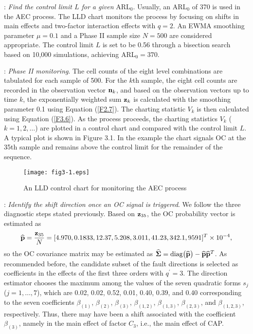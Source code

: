 : {\it Find the control limit $L$ for a given} ARL$_0$.
Usually, an ARL$_0$ of 370 is used in the AEC process. The LLD chart monitors the
process by focusing on shifts in main effects and two-factor interaction effects
with $q=2$. An EWMA smoothing parameter $\mu=0.1$ and a Phase II sample size $N=500$
are considered appropriate. The control limit $L$ is set to be 0.56 through a
bisection search based on 10,000 simulations, achieving ARL$_0=370$.

: {\it Phase II monitoring}. The cell counts of the eight level
combinations are tabulated for each sample of 500. For the $k$th sample, the eight
cell counts are recorded in the observation vector ${\bf n}_k$, and based on the
observation vectors up to time $k$, the exponentially weighted sum ${\bf z}_k$ is
calculated with the smoothing parameter 0.1 using Equation (\ref{F2.7}). The
charting statistic $V_k$ is then calculated using Equation (\ref{F3.6}). As the
process proceeds, the charting statistics $V_k$ ($k=1,2,\ldots$) are plotted in a
control chart and compared with the control limit $L$. A typical plot is shown in
Figure 3.1. In the example the chart signals OC at the 35th sample and remains above
the control limit for the remainder of the sequence.

\begin{figure}[ht]
\begin{center}
\texttt{[image: fig3-1.eps]}
\vspace{-0.7cm} \caption{An LLD control chart for monitoring the AEC
process}\vspace{-0.3cm}
\end{center}
\end{figure}

: {\it Identify the shift direction once an OC signal is
triggered}. We follow the three diagnostic steps stated previously. Based on ${\bf
z}_{35}$, the OC probability vector is estimated as
\[
\widehat{{\bf p}}=\frac{{\bf z}_{35}}{N}=[4.970, 0.1833, 12.37, 5.208, 3.011, 41.23,
342.1, 9591]^T\times 10^{-4},
\]
so the OC covariance matrix may be estimated as
$\widehat{\boldsymbol{\Sigma}}=\mathrm{diag}\big(\widehat{{\bf p}}\big)-\widehat{{\bf p}}\widehat{{\bf
p}}^T$. As recommended before, the candidate subset of the fault directions is
selected as coefficients in the effects of the first three orders with
$q^{\prime}=3$. The direction estimator chooses the maximum among the values of the
seven quadratic forms $s_j$ ($j=1,\ldots,7$), which are 0.02, 0.02, 0.52, 0.01,
0.40, 0.39, and 0.40 corresponding to the seven coefficients $\beta_{(1)}$,
$\beta_{(2)}$, $\beta_{(3)}$, $\beta_{(1,2)}$, $\beta_{(1,3)}$, $\beta_{(2,3)}$, and
$\beta_{(1,2,3)}$, respectively. Thus, there may have been a shift associated with
the coefficient $\beta_{(3)}$, namely in the main effect of factor $C_3$, i.e., the
main effect of CAP.



